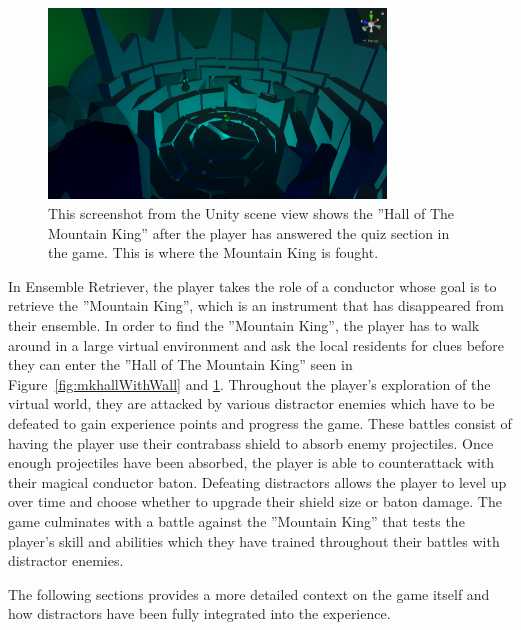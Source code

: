 \begin{figure}[tbph]
    \centering
    \includegraphics[width=0.8\textwidth]{figures/screenshots/HallOfTheMountainKing2KindaLowRes.png}
    \caption[Screenshot of the ''Hall of The Mountain King'' Without the Quiz Wall]{This screenshot from the Unity scene view shows the ''Hall of The Mountain King'' after the player has answered the quiz section in the game. This is where the Mountain King is fought.}
    \label{fig:mkhallWithoutWall}
\end{figure}
In Ensemble Retriever, the player takes the role of a conductor whose goal is to retrieve the ''Mountain King'', which is an instrument that has disappeared from their ensemble. In order to find the ''Mountain King'', the player has to walk around in a large virtual environment and ask the local residents for clues before they can enter the ''Hall of The Mountain King'' seen in Figure~\ref{fig:mkhallWithWall} and \ref{fig:mkhallWithoutWall}. Throughout the player's exploration of the virtual world, they are attacked by various distractor enemies which have to be defeated to gain experience points and progress the game. These battles consist of having the player use their contrabass shield to absorb enemy projectiles. Once enough projectiles have been absorbed, the player is able to counterattack with their magical conductor baton. Defeating distractors allows the player to level up over time and choose whether to upgrade their shield size or baton damage. The game culminates with a battle against the ''Mountain King'' that tests the player's skill and abilities which they have trained throughout their battles with distractor enemies.  

The following sections provides a more detailed context on the game itself and how distractors have been fully integrated into the experience.

